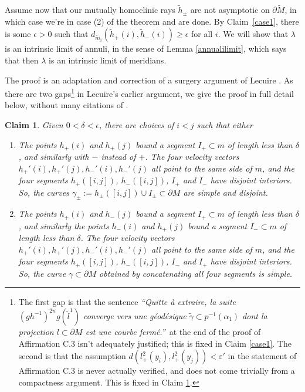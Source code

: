 \documentclass[12pt]{amsart}
\newtheorem{claim}[theorem]{Claim}
\theoremstyle{definition}
\theoremstyle{remark}
\begin{document}
Assume now that our mutually homoclinic rays $\tilde h_\pm$ are not asymptotic on $ \partial \tilde M$, in which case we're in case (2) of the theorem and are done. By Claim~\ref{case1}, there is some $\epsilon>0$ such that $d_{\tilde m_i}( \tilde h_+(i),\tilde h_-(i)) \geq \epsilon$ for all $i$. We will show that  $\lambda $ is an intrinsic limit of annuli, in the sense of  Lemma \ref {annualilimit}, which says that then $\lambda$ is an intrinsic limit of meridians.

The proof is an adaptation and correction of a surgery argument of Lecuire \cite[Affirmation C.3]{Lecuireplissage}. As there are two gaps\footnote{The first gap is that the sentence \emph{``Quitte \`a extraire, la suite $(gh^{-1})^{2n} g(\tilde l^1)$ converge vers une g\'eod\'esique $\tilde  \gamma \subset p^{-1}(\alpha_1)$ dont la projection $l \subset \partial M$ est une courbe ferm\'e.''}\  at the end of the proof of Affirmation C.3 isn't adequately justified; this is fixed in Claim \ref{case1}. The second  is that the assumption $d(l_+^2(y_i),l_+^2(y_j))<\varepsilon'$  in the statement of Affirmation C.3 is never actually verified, and does not come trivially from a compactness argument.  This is fixed in Claim \ref{affclaim}.} in Lecuire's earlier argument, we give the proof in full detail below, without many citations of \cite{Lecuireplissage}.


\begin{claim} \label{affclaim}
Given $0<\delta<\epsilon$, there are choices of $i<j$  such that  either
\begin{enumerate}
\item[(I)] The points $h_+(i)$ and $h_+(j)$ bound a segment $I_+ \subset m$ of length less than $\delta$, and similarly with $-$ instead of $+$. The four velocity vectors $h_+'(i), h_+'(j), h_-'(i), h_-'(j)$ all point to the same side of $m$, and the four segments $h_+([i,j])$, $h_-([i,j])$, $I_+$ and $I_-$ have disjoint interiors. So, the curves $\gamma_\pm:= h_\pm([i,j]) \cup I_\pm \subset \partial M$ are simple and disjoint.
\item[(II)] The points $h_+(i)$ and $h_-(j)$ bound a segment $I_+ \subset m$ of length less than $\delta$, and  similarly the points $h_-(i)$ and $h_+(j)$ bound a segment $I_- \subset m$ of length less than $\delta$. The four velocity vectors $h_+'(i), h_+'(j), h_-'(i), h_-'(j)$ all point to the same side of $m$, and the four segments $h_+([i,j])$, $h_-([i,j])$, $I_-$ and $I_+$ have disjoint interiors. So, the curve $\gamma\subset \partial M$ obtained by concatenating all four segments is simple.

\end{enumerate}
\end{claim}
\end{document}
